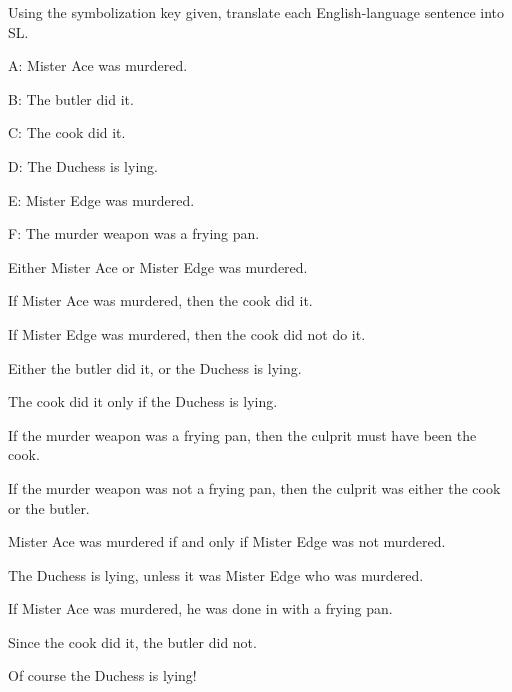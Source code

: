 {\problempart Using the symbolization key given, translate each English-language sentence into SL.
\begin{ekey}
\item[A:] Mister Ace was murdered.
\item[B:] The butler did it.
\item[C:] The cook did it.
\item[D:] The Duchess is lying.
\item[E:] Mister Edge was murdered.
\item[F:] The murder weapon was a frying pan.
\end{ekey}
\begin{earg}
\item Either Mister Ace or Mister Edge was murdered.
\item If Mister Ace was murdered, then the cook did it.
\item If Mister Edge was murdered, then the cook did not do it.
\item Either the butler did it, or the Duchess is lying.
\item The cook did it only if the Duchess is lying.
\item If the murder weapon was a frying pan, then the culprit must have been the cook.
\item If the murder weapon was not a frying pan, then the culprit was either the cook or the butler.
\item Mister Ace was murdered if and only if Mister Edge was not murdered.
\item The Duchess is lying, unless it was Mister Edge who was murdered.
\item If Mister Ace was murdered, he was done in with a frying pan.
\item Since the cook did it, the butler did not.
\item Of course the Duchess is lying!
\end{earg}



}
